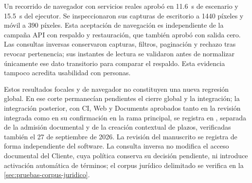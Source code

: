 Un recorrido de navegador con servicios reales aprobó en 11.6~s de escenario y 15.5~s del ejecutor. Se inspeccionaron sus capturas de escritorio a 1440 píxeles y móvil a 390 píxeles. Esta aceptación de navegación es independiente de la campaña API con respaldo y restauración, que también aprobó con salida cero. Las consultas inversas conservaron capturas, filtros, paginación y rechazo tras revocar pertenencia; sus instantes de lectura se validaron antes de normalizar únicamente ese dato transitorio para comparar el respaldo. Esta evidencia tampoco acredita usabilidad con personas.

Estos resultados focales y de navegador no constituyen una nueva regresión global. En ese corte permanecían pendientes el cierre global y la integración; la integración posterior, con CI, Web y Documents aprobados tanto en la revisión integrada como en su confirmación en la rama principal, se registra en , separada de la admisión documental y de la creación contextual de plazos, verificadas también el 27 de septiembre de 2026. La revisión del manuscrito se registra de forma independiente del software. La consulta inversa no modifica el acceso documental del Cliente, cuya política conserva su decisión pendiente, ni introduce activación automática de términos; el corpus jurídico delimitado se verifica en la \cref{sec:pruebas-corpus-juridico}.

